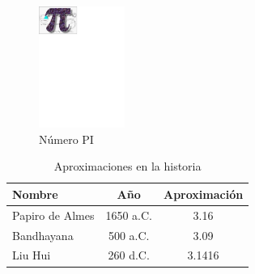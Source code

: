 \documentclass[a4paper,12pt]{article}
\begin{document}
\begin{figure}[!th]
\begin{center}
\includegraphics[width=0.25\textwidth]{images/figura2.eps}
\caption{Número PI}
\label{num_pi}
\end{center}
\end{figure}

\begin{table}[!ht]
\begin{tabular}{|l|c|c|}
\hline
Nombre & Año & Aproximación\\ \hline
Papiro de Almes & 1650 a.C. & 3.16\\ \hline
Bandhayana & 500 a.C. & 3.09\\ \hline
Liu Hui & 260 d.C. & 3.1416\\ \hline
\end{tabular}
\cite{educacion}
\caption{Aproximaciones en la historia}
\label{tabla}
\end{table}

\begin{thebibliography}{00}

\end{thebibliography}
\end{document}
